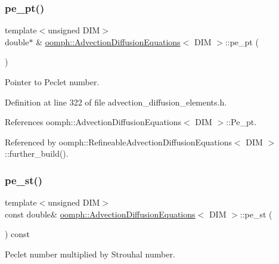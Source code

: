 \subsubsection{\texorpdfstring{pe\+\_\+pt()}{pe\_pt()}}
{\footnotesize\ttfamily template$<$unsigned D\+IM$>$ \\
double$\ast$ \& \hyperlink{classoomph_1_1AdvectionDiffusionEquations}{oomph\+::\+Advection\+Diffusion\+Equations}$<$ D\+IM $>$\+::pe\+\_\+pt (\begin{DoxyParamCaption}{ }\end{DoxyParamCaption})\hspace{0.3cm}{\ttfamily [inline]}}



Pointer to Peclet number. 



Definition at line 322 of file advection\+\_\+diffusion\+\_\+elements.\+h.



References oomph\+::\+Advection\+Diffusion\+Equations$<$ D\+I\+M $>$\+::\+Pe\+\_\+pt.



Referenced by oomph\+::\+Refineable\+Advection\+Diffusion\+Equations$<$ D\+I\+M $>$\+::further\+\_\+build().

\mbox{\label{classoomph_1_1AdvectionDiffusionEquations_ad23f5906cc0b088d778e1694719138e0}} 
\subsubsection{\texorpdfstring{pe\+\_\+st()}{pe\_st()}}
{\footnotesize\ttfamily template$<$unsigned D\+IM$>$ \\
const double\& \hyperlink{classoomph_1_1AdvectionDiffusionEquations}{oomph\+::\+Advection\+Diffusion\+Equations}$<$ D\+IM $>$\+::pe\+\_\+st (\begin{DoxyParamCaption}{ }\end{DoxyParamCaption}) const\hspace{0.3cm}{\ttfamily [inline]}}



Peclet number multiplied by Strouhal number. 



